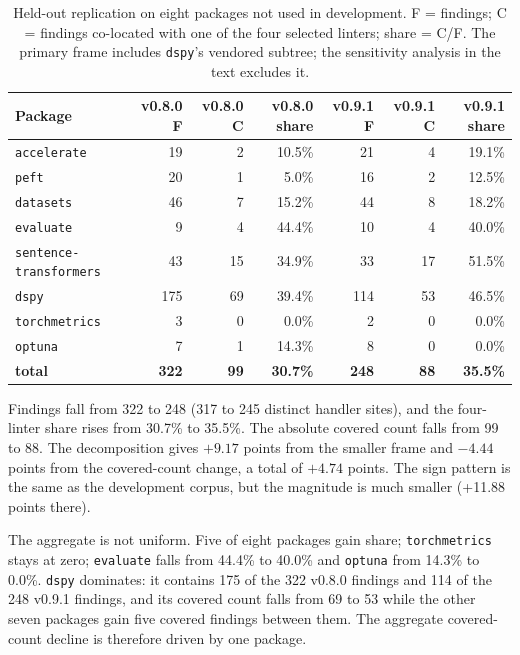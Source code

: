 \documentclass[10pt,a4paper]{article}
\begin{document}
\begin{table}[htbp]
\centering\footnotesize
\caption{Held-out replication on eight packages not used in development.
F = findings; C = findings co-located with one of the four selected linters;
share = C/F. The primary frame includes \texttt{dspy}'s vendored subtree; the
sensitivity analysis in the text excludes it.}
\label{tab:heldout}
\begin{tabular}{@{}p{3.2cm}rrrrrr@{}}
\toprule
Package & v0.8.0 F & v0.8.0 C & v0.8.0 share & v0.9.1 F & v0.9.1 C & v0.9.1 share \\
\midrule
\texttt{accelerate} & 19 & 2 & 10.5\% & 21 & 4 & 19.1\% \\
\texttt{peft} & 20 & 1 & 5.0\% & 16 & 2 & 12.5\% \\
\texttt{datasets} & 46 & 7 & 15.2\% & 44 & 8 & 18.2\% \\
\texttt{evaluate} & 9 & 4 & 44.4\% & 10 & 4 & 40.0\% \\
\texttt{sentence-transformers} & 43 & 15 & 34.9\% & 33 & 17 & 51.5\% \\
\texttt{dspy} & 175 & 69 & 39.4\% & 114 & 53 & 46.5\% \\
\texttt{torchmetrics} & 3 & 0 & 0.0\% & 2 & 0 & 0.0\% \\
\texttt{optuna} & 7 & 1 & 14.3\% & 8 & 0 & 0.0\% \\
\midrule
\textbf{total} & \textbf{322} & \textbf{99} & \textbf{30.7\%} & \textbf{248} & \textbf{88} & \textbf{35.5\%} \\
\bottomrule
\end{tabular}
\end{table}

Findings fall from 322 to 248 (317 to 245 distinct handler sites), and the
four-linter share rises from 30.7\% to 35.5\%. The absolute covered count falls
from 99 to 88. The decomposition gives $+9.17$ points from the smaller frame
and $-4.44$ points from the covered-count change, a total of $+4.74$ points.
The sign pattern is the same as the development corpus, but the magnitude is
much smaller (+11.88 points there).

The aggregate is not uniform. Five of eight packages gain share;
\texttt{torchmetrics} stays at zero; \texttt{evaluate} falls from 44.4\% to
40.0\% and \texttt{optuna} from 14.3\% to 0.0\%.
\texttt{dspy} dominates: it contains 175 of the 322 v0.8.0 findings and 114 of
the 248 v0.9.1 findings, and its covered count falls from 69 to 53 while the
other seven packages gain five covered findings between them. The aggregate
covered-count decline is therefore driven by one package.
\end{document}
